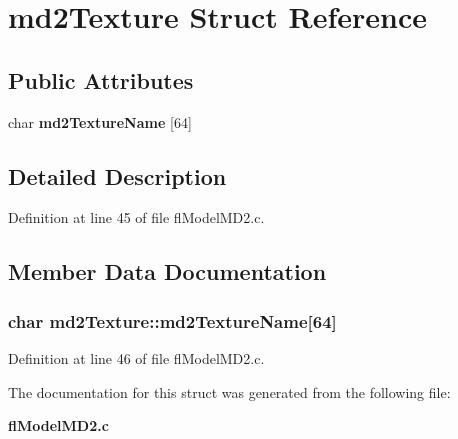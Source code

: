 \section{md2Texture Struct Reference}
\label{structmd2Texture}
\subsection*{Public Attributes}
\begin{CompactItemize}
\item 
char {\bf md2Texture\-Name} [64]
\end{CompactItemize}


\subsection{Detailed Description}




Definition at line 45 of file fl\-Model\-MD2.c.

\subsection{Member Data Documentation}
\subsubsection{\setlength{\rightskip}{0pt plus 5cm}char {\bf md2Texture::md2Texture\-Name}[64]}\label{structmd2Texture_28111d460cc26070b007d00085782d8d}




Definition at line 46 of file fl\-Model\-MD2.c.

The documentation for this struct was generated from the following file:\begin{CompactItemize}
\item 
{\bf fl\-Model\-MD2.c}\end{CompactItemize}
